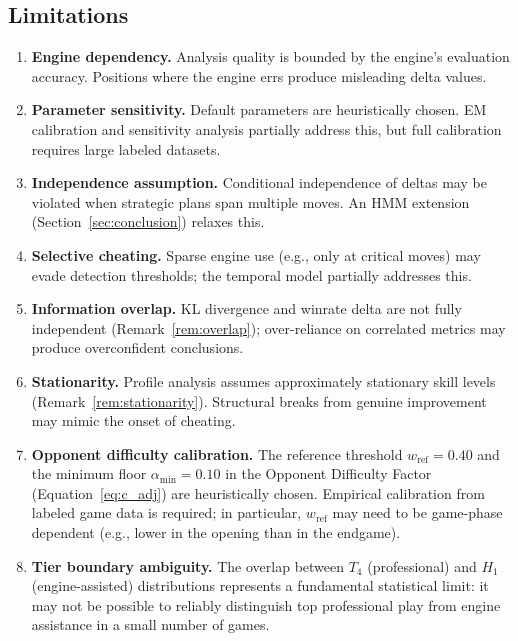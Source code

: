 \documentclass[11pt,a4paper]{article}
\begin{document}
\subsection{Limitations}

\begin{enumerate}
    \item \textbf{Engine dependency.} Analysis quality is bounded by the
          engine's evaluation accuracy. Positions where the engine errs
          produce misleading delta values.
    \item \textbf{Parameter sensitivity.} Default parameters are heuristically
          chosen. EM calibration and sensitivity analysis partially address
          this, but full calibration requires large labeled datasets.
    \item \textbf{Independence assumption.} Conditional independence of deltas
          may be violated when strategic plans span multiple moves. An HMM
          extension (Section~\ref{sec:conclusion}) relaxes this.
    \item \textbf{Selective cheating.} Sparse engine use (e.g., only at critical
          moves) may evade detection thresholds; the temporal model partially
          addresses this.
    \item \textbf{Information overlap.} KL divergence and winrate delta are not
          fully independent (Remark~\ref{rem:overlap}); over-reliance on
          correlated metrics may produce overconfident conclusions.
    \item \textbf{Stationarity.} Profile analysis assumes approximately
          stationary skill levels (Remark~\ref{rem:stationarity}). Structural
          breaks from genuine improvement may mimic the onset of cheating.
    \item \textbf{Opponent difficulty calibration.} The reference threshold
          $w_{\text{ref}} = 0.40$ and the minimum floor $\alpha_{\min} = 0.10$
          in the Opponent Difficulty Factor (Equation~\eqref{eq:c_adj}) are
          heuristically chosen. Empirical calibration from labeled game data
          is required; in particular, $w_{\text{ref}}$ may need to be
          game-phase dependent (e.g., lower in the opening than in the endgame).
    \item \textbf{Tier boundary ambiguity.} The overlap between
          $T_4$ (professional) and $H_1$ (engine-assisted) distributions
          represents a fundamental statistical limit: it may not be possible
          to reliably distinguish top professional play from engine assistance
          in a small number of games.
\end{enumerate}
\end{document}

